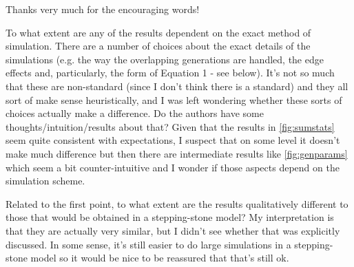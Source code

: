 Thanks very much for the encouraging words!

\begin{point}{}
    To what extent are any of the results dependent on the exact method of simulation. There are a number of choices about the exact details of the simulations (e.g. the way the overlapping generations are handled, the edge effects and, particularly, the form of Equation 1 - see below). It's not so much that these are non-standard (since I don't think there is a standard) and they all sort of make sense heuristically, and I was left wondering whether these sorts of choices actually make a difference. Do the authors have some thoughts/intuition/results about that? Given that the results in \autoref{fig:sumstats} seem quite consistent with expectations, I suspect that on some level it doesn't make much difference but then there are intermediate results like \autoref{fig:genparams} which seem a bit counter-intuitive and I wonder if those aspects depend on the simulation scheme.
\end{point}


\begin{point}{}
    Related to the first point, to what extent are the results qualitatively different to those that would be obtained in a stepping-stone model? My interpretation is that they are actually very similar, but I didn't see whether that was explicitly discussed. In some sense, it's still easier to do large simulations in a stepping-stone model so it would be nice to be reassured that that's still ok.
\end{point}



